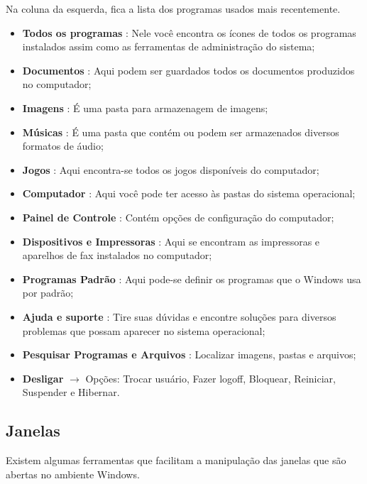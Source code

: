 \documentclass[hidelinks,12pt]{article}
\begin{document}
Na coluna da esquerda, fica a lista dos programas usados mais recentemente.

\begin{itemize}
	\item \textbf{Todos os programas} : Nele você encontra os ícones de todos os programas instalados assim como as ferramentas de administração do sistema;

	\item \textbf{Documentos} : Aqui podem ser guardados todos os documentos produzidos no computador;

	\item \textbf{Imagens} : É uma pasta para armazenagem de imagens;

	\item \textbf{Músicas} : É uma pasta que contém ou podem ser armazenados diversos formatos de áudio;

	\item \textbf{Jogos} : Aqui encontra-se todos os jogos disponíveis do computador;

	\item \textbf{Computador} : Aqui você pode ter acesso às pastas do sistema operacional;

	\item \textbf{Painel de Controle} : Contém opções de configuração do computador;

	\item \textbf{Dispositivos e Impressoras} : Aqui se encontram as impressoras e aparelhos de fax instalados no computador;

	\item \textbf{Programas Padrão} : Aqui pode-se definir os programas que o Windows usa por padrão;

	\item \textbf{Ajuda e suporte} : Tire suas dúvidas e encontre soluções para diversos problemas que possam aparecer no sistema operacional;

	\item \textbf{Pesquisar Programas e Arquivos} : Localizar imagens, pastas e arquivos;

	\item \textbf{Desligar} $\rightarrow$ Opções: Trocar usuário, Fazer logoff, Bloquear, Reiniciar, Suspender e Hibernar.
\end{itemize}

\subsection{Janelas}
Existem algumas ferramentas que facilitam a manipulação das janelas que são abertas no ambiente Windows.
\end{document}
